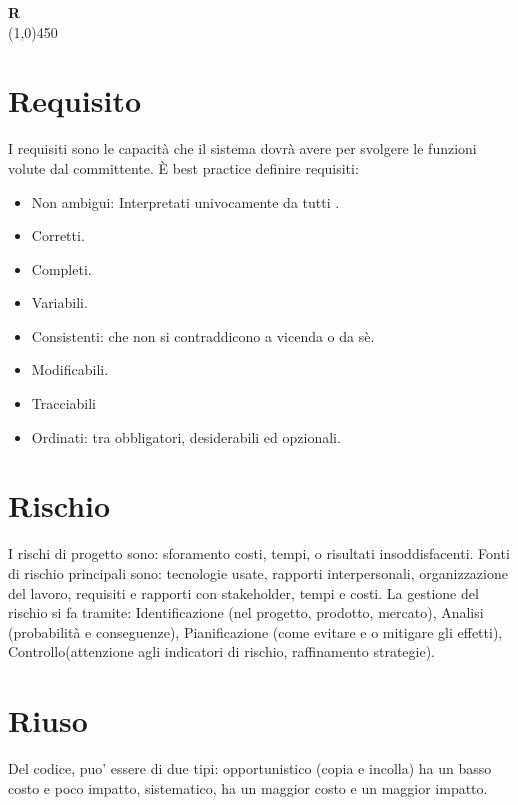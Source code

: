 \documentclass[11pt]{article}
\begin{document}
		\newpage

	{\Huge{\textbf{R}}} \\
	\line(1,0){450}

	\section{\LARGE Requisito}
	\label{sec:requisito}
	I requisiti sono le capacità che il sistema dovrà avere per svolgere le funzioni volute dal committente. È best practice definire requisiti:
	\begin{itemize}  
	\item Non ambigui: Interpretati univocamente da tutti .
	\item Corretti.
	\item Completi.
	\item Variabili.
	\item Consistenti: che non si contraddicono a vicenda o da sè.
	\item Modificabili.
	\item Tracciabili
	\item Ordinati: tra obbligatori, desiderabili ed opzionali. 
	\end{itemize}

	\section{\LARGE Rischio}
	\label{sec:rischio}
	I rischi di progetto sono: sforamento costi, tempi, o risultati insoddisfacenti. Fonti di rischio principali sono:
	tecnologie usate, rapporti interpersonali, organizzazione del lavoro, requisiti e rapporti con stakeholder, tempi e costi.
	La gestione del rischio si fa tramite:
	Identificazione (nel progetto, prodotto, mercato), Analisi (probabilità e conseguenze), Pianificazione (come evitare e o mitigare gli effetti), Controllo(attenzione agli indicatori di rischio, raffinamento strategie).
	
	\section{\LARGE Riuso}
	\label{sec:riuso}
	Del codice, puo' essere di due tipi: opportunistico (copia e incolla) ha un basso costo e poco impatto, sistematico, ha un maggior costo e un maggior impatto.		
\end{document}
